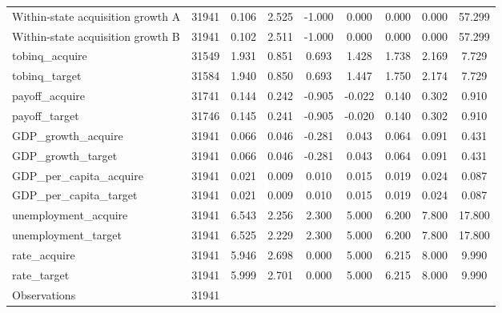 {\begin{tabular}{l*{1}{cccccccc}}
Within-state acquisition growth A&       31941&       0.106&       2.525&      -1.000&       0.000&       0.000&       0.000&      57.299\\
Within-state acquisition growth B&       31941&       0.102&       2.511&      -1.000&       0.000&       0.000&       0.000&      57.299\\
tobinq\_acquire      &       31549&       1.931&       0.851&       0.693&       1.428&       1.738&       2.169&       7.729\\
tobinq\_target       &       31584&       1.940&       0.850&       0.693&       1.447&       1.750&       2.174&       7.729\\
payoff\_acquire      &       31741&       0.144&       0.242&      -0.905&      -0.022&       0.140&       0.302&       0.910\\
payoff\_target       &       31746&       0.145&       0.241&      -0.905&      -0.020&       0.140&       0.302&       0.910\\
GDP\_growth\_acquire  &       31941&       0.066&       0.046&      -0.281&       0.043&       0.064&       0.091&       0.431\\
GDP\_growth\_target   &       31941&       0.066&       0.046&      -0.281&       0.043&       0.064&       0.091&       0.431\\
GDP\_per\_capita\_acquire&       31941&       0.021&       0.009&       0.010&       0.015&       0.019&       0.024&       0.087\\
GDP\_per\_capita\_target&       31941&       0.021&       0.009&       0.010&       0.015&       0.019&       0.024&       0.087\\
unemployment\_acquire&       31941&       6.543&       2.256&       2.300&       5.000&       6.200&       7.800&      17.800\\
unemployment\_target &       31941&       6.525&       2.229&       2.300&       5.000&       6.200&       7.800&      17.800\\
rate\_acquire        &       31941&       5.946&       2.698&       0.000&       5.000&       6.215&       8.000&       9.990\\
rate\_target         &       31941&       5.999&       2.701&       0.000&       5.000&       6.215&       8.000&       9.990\\
\midrule
Observations        &       31941&            &            &            &            &            &            &            \\
\bottomrule
\end{tabular}
}
